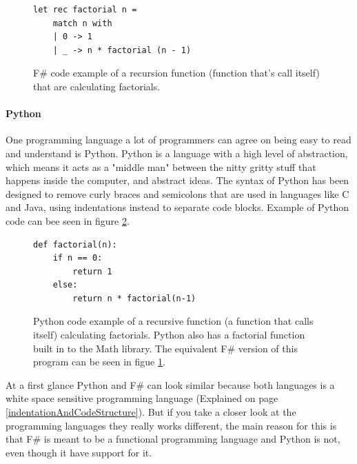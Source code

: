 \documentclass[12pt, a4paper]{article}
\begin{document}
\begin{figure}[!h]
	\begin{lstlisting}
let rec factorial n =
    match n with
    | 0 -> 1
    | _ -> n * factorial (n - 1)
	\end{lstlisting}
	\caption{F\# code example of a recursion function (function that's call itself) that are calculating factorials.}
	\label{fig:factorialFsharpExample}
\end{figure}

\newpage
\paragraph{Python}

One programming language a lot of programmers can agree on being easy to read and understand is Python. Python is a language with a high level of abstraction, which means it acts as a "middle man" between the nitty gritty stuff that happens inside the computer, and abstract ideas. The syntax of Python has been designed to remove curly braces and semicolons that are used in languages like C and Java, using indentations instead to separate code blocks. Example of Python code can bee seen in figure \ref{fig:pythonFactorial}.\\


\begin{figure}[!h]
	\begin{lstlisting}
def factorial(n):
    if n == 0:
        return 1
    else:
        return n * factorial(n-1)
	\end{lstlisting}
	\caption{Python code example of a recursive function (a function that calls itself) calculating factorials. Python also has a factorial function built in to the Math library. The equivalent F\# version of this program can be seen in figue \ref{fig:factorialFsharpExample}.}
	\label{fig:pythonFactorial}
\end{figure}

At a first glance Python and F\# can look similar because both languages is a white space sensitive programming language (Explained on page \ref{indentationAndCodeStructure}). But if you take a closer look at the programming languages they really works different, the main reason for this is that F\# is meant to be a functional programming language and Python is not, even though it have support for it.\\
\end{document}
